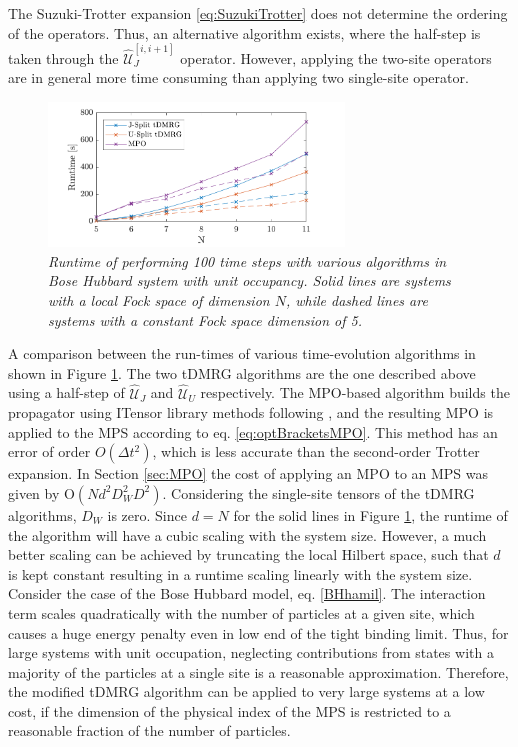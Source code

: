 The Suzuki-Trotter expansion \eqref{eq:SuzukiTrotter} does not determine the ordering of the operators. Thus, an alternative algorithm exists, where the half-step is taken through the $\hat{\mathcal{U}}_{J}^{[i,i+1]}$ operator. However, applying the two-site operators are in general more time consuming than applying two single-site operator.
\begin{figure}[h!]
    \centering
    \includegraphics[width=0.7\textwidth]{Figures/CompareRuntime.pdf}
    \caption{\textit{Runtime of performing 100 time steps with various algorithms in Bose Hubbard system with unit occupancy. Solid lines are systems with a local Fock space of dimension $N$, while dashed lines are systems with a constant Fock space dimension of 5.}}
    \label{fig:CompareRuntime}
\end{figure}
A comparison between the run-times of various time-evolution algorithms in shown in Figure \ref{fig:CompareRuntime}. The two tDMRG algorithms are the one described above using a half-step of $\hat{\mathcal{U}}_{J}$ and $\hat{\mathcal{U}}_{U}$ respectively. The MPO-based algorithm builds the propagator using ITensor library methods following \cite{Pollmann2015}, and the resulting MPO is applied to the MPS according to eq. \eqref{eq:optBracketsMPO}. This method has an error of order $O(\Delta t ^2)$, which is less accurate than the second-order Trotter expansion.
In Section \ref{sec:MPO} the cost of applying an MPO to an MPS was given by $\mathrm{O}(N d^2 D_W ^2 D^2)$. Considering the single-site tensors of the tDMRG algorithms, $D_W$ is zero. Since $d = N$ for the solid lines in Figure \ref{fig:CompareRuntime}, the runtime of the algorithm will have a cubic scaling with the system size. However, a much better scaling can be achieved by truncating the local Hilbert space, such that $d$ is kept constant resulting in a runtime scaling linearly with the system size.
Consider the case of the Bose Hubbard model, eq. \eqref{BHhamil}. The interaction term scales quadratically with the number of particles at a given site, which causes a huge energy penalty even in low end of the tight binding limit. Thus, for large systems with unit occupation, neglecting contributions from states with a majority of the particles at a single site is a reasonable approximation.
Therefore, the modified tDMRG algorithm can be applied to very large systems at a low cost, if the dimension of the physical index of the MPS is restricted to a reasonable fraction of the number of particles.   